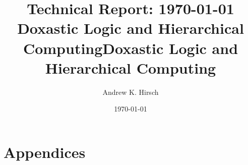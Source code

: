 \documentclass[acmsmall,review,anonymous]{acmart}
\title[Doxastic Logic and Hierarchical Computing]{{\small Technical Report: \hfill \today}\\ Doxastic Logic and Hierarchical Computing}
\date{\today}
\title{Doxastic Logic and Hierarchical Computing}
\date{}
\author{Andrew K. Hirsch}
\affiliation{
    \institution{University at Buffalo}
    \city{Buffalo}
    \country{USA}
  }
\begin{document}
\begin{abstract}
  
\end{abstract}



\maketitle


\iftr
  \appendix
  \section*{Appendices}
  

\fi  
  
\end{document}
